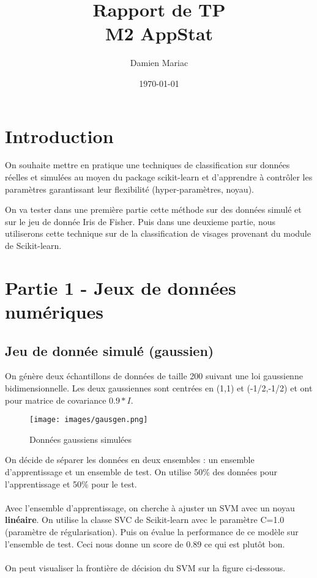 \documentclass[a4paper, 12pt]{article}
\title{Rapport de TP \\ \large{M2 AppStat}}
\author{Damien Mariac}
\date{\today}
\begin{document}
\maketitle

\newpage

\section*{Introduction}

On souhaite mettre en pratique une techniques de classification sur données réelles et
simulées au moyen du package scikit-learn et d’apprendre à contrôler les paramètres garantissant leur flexibilité (hyper-paramètres, noyau).

On va tester dans une première partie cette méthode sur des données simulé et sur le jeu de donnée Iris de Fisher.
Puis dans une deuxieme partie, nous utiliserons cette technique sur de la classification de visages provenant  du module de Scikit-learn.

\section*{Partie 1 - Jeux de données numériques}

\subsection*{Jeu de donnée simulé (gaussien)}

On génère deux échantillons de données de taille 200 suivant une loi gaussienne bidimensionnelle. Les deux gaussiennes sont centrées en (1,1) et (-1/2,-1/2) et ont pour matrice de covariance $0.9 * I$.


\begin{figure}[!htbp]
    \centering
    \texttt{[image: images/gausgen.png]}
    \caption{Données gaussiens simulées}
    \label{fig:gaussian_data}
\end{figure}

On décide de séparer les données en deux ensembles : un ensemble d'apprentissage et un ensemble de test. On utilise 50\% des données pour l'apprentissage et 50\% pour le test.
\\
\\
Avec l'ensemble d'apprentissage, on cherche à ajuster un SVM avec un noyau \textbf{linéaire}. On utilise la classe SVC de Scikit-learn avec le paramètre C=1.0 (paramètre de régularisation).
Puis on évalue la performance de ce modèle sur l'ensemble de test. Ceci nous donne un score de 0.89 ce qui est plutôt bon.
\\
\\
On peut visualiser la frontière de décision du SVM sur la figure ci-dessous.
\end{document}

